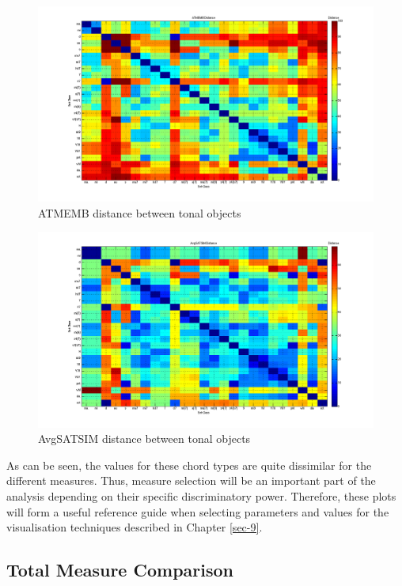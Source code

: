 \documentclass{article}
\begin{document}
\begin{figure}[htb]
\centering
\includegraphics[scale=0.2]{../plots/ATMEMB_chord_comparison.png}
\caption{\label{fig:atmembchordcomp}ATMEMB distance between tonal objects}
\end{figure}
\begin{figure}[htb]
\centering
\includegraphics[scale=0.2]{../plots/AvgSATSIM_chord_comparison.png}
\caption{\label{fig:avgsatsimchordcomp}AvgSATSIM distance between tonal objects}
\end{figure}

As can be seen, the values for these chord types are quite dissimilar
for the different measures. Thus, measure selection will be an
important part of the analysis depending on their specific
discriminatory power. Therefore, these plots will form a useful
reference guide when selecting parameters and values for the
visualisation techniques described in Chapter \ref{sec-9}.
\subsection{Total Measure Comparison}
\label{sec-7-8}
\end{document}
